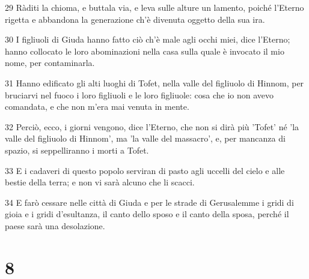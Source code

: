 \par 29 Ràditi la chioma, e buttala via, e leva sulle alture un lamento, poiché l'Eterno rigetta e abbandona la generazione ch'è divenuta oggetto della sua ira.
\par 30 I figliuoli di Giuda hanno fatto ciò ch'è male agli occhi miei, dice l'Eterno; hanno collocato le loro abominazioni nella casa sulla quale è invocato il mio nome, per contaminarla.
\par 31 Hanno edificato gli alti luoghi di Tofet, nella valle del figliuolo di Hinnom, per bruciarvi nel fuoco i loro figliuoli e le loro figliuole: cosa che io non avevo comandata, e che non m'era mai venuta in mente.
\par 32 Perciò, ecco, i giorni vengono, dice l'Eterno, che non si dirà più 'Tofet' né 'la valle del figliuolo di Hinnom', ma 'la valle del massacro', e, per mancanza di spazio, si seppelliranno i morti a Tofet.
\par 33 E i cadaveri di questo popolo serviran di pasto agli uccelli del cielo e alle bestie della terra; e non vi sarà alcuno che li scacci.
\par 34 E farò cessare nelle città di Giuda e per le strade di Gerusalemme i gridi di gioia e i gridi d'esultanza, il canto dello sposo e il canto della sposa, perché il paese sarà una desolazione.

\chapter{8}

